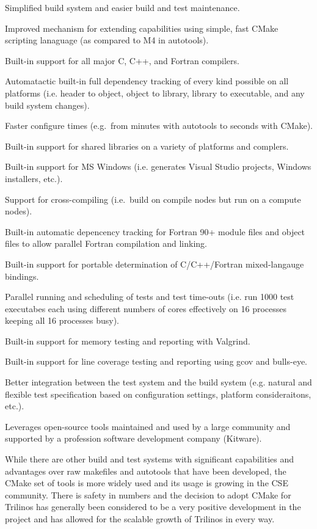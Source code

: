 \documentclass[note]{TechNote}
\begin{document}
\begin{compactitem}
\item Simplified build system and easier build and test maintenance.
\item Improved mechanism for extending capabilities using simple, fast CMake scripting lanaguage (as compared to M4 in autotools).
\item Built-in support for all major C, C++, and Fortran compilers.
\item Automatactic built-in full dependency tracking of every kind possible on all platforms (i.e. header to object, object to library, library to executable, and any build system changes).
\item Faster configure times (e.g.\ from minutes with autotools to seconds with CMake).
\item Built-in support for shared libraries on a variety of platforms and complers.
\item Built-in support for MS Windows (i.e. generates Visual Studio projects, Windows installers, etc.).
\item Support for cross-compiling (i.e.\ build on compile nodes but run on a compute nodes).
\item Built-in automatic depencency tracking for Fortran 90+ module files and object files to allow parallel Fortran compilation and linking.
\item Built-in support for portable determination of C/C++/Fortran mixed-langauge bindings.
\item Parallel running and scheduling of tests and test time-outs (i.e. run 1000 test executabes each using different numbers of cores effectively on 16 processes keeping all 16 processes busy).
\item Built-in support for memory testing and reporting with Valgrind.
\item Built-in support for line coverage testing and reporting using gcov and bulls-eye.
\item Better integration between the test system and the build system (e.g. natural and flexible test specification based on configuration settings, platform consideraitons, etc.).
\item Leverages open-source tools maintained and used by a large community and supported by a profession software development company (Kitware).
\end{compactitem}

While there are other build and test systems with significant capabilities and advantages over raw makefiles and autotools that have been developed, the CMake set of tools is more widely used and its usage is growing in the CSE community.  There is safety in numbers and the decision to adopt CMake for Trilinos has generally been considered to be a very positive development in the project and has allowed for the scalable growth of Trilinos in every way.
\end{document}

